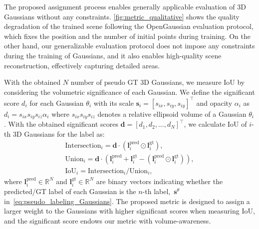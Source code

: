 The proposed assignment process enables generally applicable evaluation of 3D Gaussians without any constraints. \cref{fig:metric_qualitative} shows the quality degradation of the trained scene following the OpenGaussian evaluation protocol, which fixes the position and the number of initial points during training. On the other hand, our generalizable evaluation protocol does not impose any constraints during the training of Gaussians, and it also enables high-quality scene reconstruction, effectively capturing detailed areas.

With the obtained $N$ number of pseudo GT 3D Gaussians, we measure IoU  by considering the volumetric significance of each Gaussian. We define the significant score $d_{i}$ for each Gaussian $\theta_i$ with its scale $\mathbf{s}_i = [s_{ix}, s_{iy}, s_{iy}]^\top$ and opacity $\alpha_i$ as $d_{i} = s_{ix}s_{iy}s_{iz} \alpha_i$ where $s_{ix}s_{iy}s_{iz}$ denotes a relative ellipsoid volume of a Gaussian $\theta_i$. With the obtained significant scores $\mathbf{d}=[d_1, d_2, ..., d_{N}]^\top$, we calculate IoU of $i$-th 3D Gaussians for the label as: 
\begin{equation}
    \begin{gathered}
        \text{Intersection}_i = \mathbf{d}\cdot(\mathbf{l}^{\text{pred}}_i \odot \mathbf{l}_i^{\text{gt}}),\\
        \text{Union}_i = \mathbf{d}\cdot (\mathbf{l}_i^{\text{pred}}+\mathbf{l}_{i}^{\text{gt}}-(\mathbf{l}_i^{\text{pred}} \odot \mathbf{l}_i^{\text{gt}})),\\
        \text{IoU}_i = {\text{Intersection}_i}/{\text{Union}_i},
    \end{gathered}
\end{equation}
where $\mathbf{l}_i^{\text{pred}} \in \mathbb{R}^N$ and $\mathbf{l}_i^\text{gt}\in \mathbb{R}^N$ are binary vectors indicating whether the predicted/GT label of each Gaussian is the $n$-th label,~$\mathbf{s}^{\theta}$ in~\cref{eq:pseudo_labeling_Gaussians}. The proposed metric is designed to assign a larger weight to the Gaussians with higher significant scores when measuring IoU, and the significant score endows our metric with volume-awareness.


